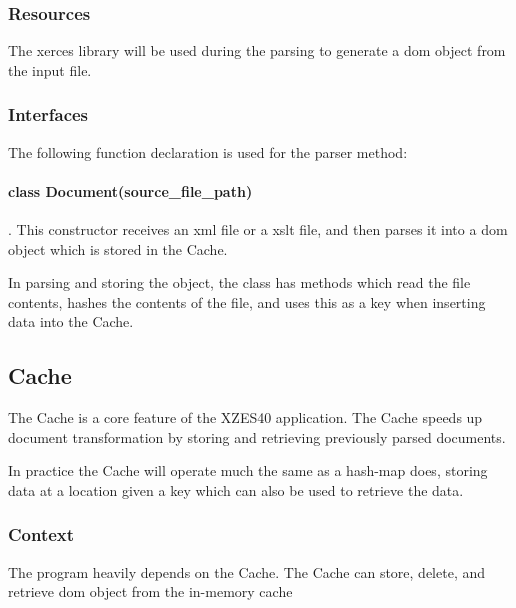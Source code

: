 \begin{enmerate}
\subsubsection{Resources}

The \gls{xerces} library will be used during the parsing to generate a \gls{dom} object from the input file.

\subsubsection{Interfaces}

The following function declaration is used for the parser method:

\paragraph{class Document(source\_file\_path)}. This constructor receives an \gls{xml} file or a \gls{xslt} file, and then parses it into a \gls{dom} object which is stored in the Cache.

In parsing and storing the object, the class has methods which read the file contents, hashes the contents of the file, and uses this as a key when inserting data into the Cache.

\subsection{Cache}
\label{cache}

The Cache is a core feature of the XZES40 application.
The Cache speeds up document transformation by storing and retrieving previously parsed documents.

In practice the Cache will operate much the same as a \gls{hash-map} does, storing data at a location given a key which can also be used to retrieve the data.

\subsubsection{Context}

The program heavily depends on the Cache.
The Cache can store, delete, and retrieve \gls{dom} object from the in-memory cache 


\end{enmerate}
